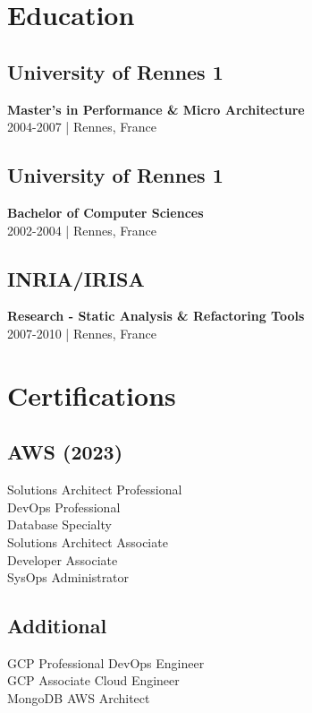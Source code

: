 \documentclass[10pt]{article}
\newcommand{\sectionsep}{\vspace{1.5pt}}
\newcommand{\subsectionsep}{\vspace{0.5pt}}
\begin{document}
\begin{paracol}{2}
\section{Education} 

\subsection{University of Rennes 1}
\textbf{Master's in Performance \& Micro Architecture}\\
2004-2007 | Rennes, France\\
\sectionsep

\subsection{University of Rennes 1}
\textbf{Bachelor of Computer Sciences}\\
2002-2004 | Rennes, France
\sectionsep

\subsection{INRIA/IRISA}
\textbf{Research - Static Analysis \& Refactoring Tools}\\
2007-2010 | Rennes, France\\
\sectionsep


\section{Certifications}

\subsection{AWS (2023)}
\subsectionsep
Solutions Architect Professional \\
DevOps Professional \\
Database Specialty \\
Solutions Architect Associate \\
Developer Associate \\
SysOps Administrator \\
\sectionsep

\subsection{Additional}
\subsectionsep
GCP Professional DevOps Engineer \\
GCP Associate Cloud Engineer \\
MongoDB AWS Architect \\
\sectionsep


\end{paracol}
\end{document}
